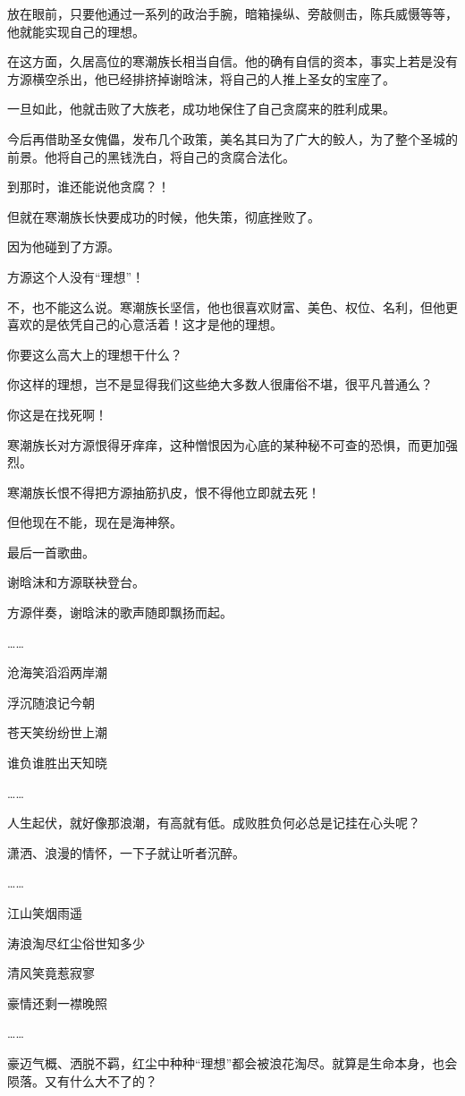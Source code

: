 \begin{this_body}
放在眼前，只要他通过一系列的政治手腕，暗箱操纵、旁敲侧击，陈兵威慑等等，他就能实现自己的理想。

在这方面，久居高位的寒潮族长相当自信。他的确有自信的资本，事实上若是没有方源横空杀出，他已经排挤掉谢晗沫，将自己的人推上圣女的宝座了。

一旦如此，他就击败了大族老，成功地保住了自己贪腐来的胜利成果。

今后再借助圣女傀儡，发布几个政策，美名其曰为了广大的鲛人，为了整个圣城的前景。他将自己的黑钱洗白，将自己的贪腐合法化。

到那时，谁还能说他贪腐？！

但就在寒潮族长快要成功的时候，他失策，彻底挫败了。

因为他碰到了方源。

方源这个人没有“理想”！

不，也不能这么说。寒潮族长坚信，他也很喜欢财富、美色、权位、名利，但他更喜欢的是依凭自己的心意活着！这才是他的理想。

你要这么高大上的理想干什么？

你这样的理想，岂不是显得我们这些绝大多数人很庸俗不堪，很平凡普通么？

你这是在找死啊！

寒潮族长对方源恨得牙痒痒，这种憎恨因为心底的某种秘不可查的恐惧，而更加强烈。

寒潮族长恨不得把方源抽筋扒皮，恨不得他立即就去死！

但他现在不能，现在是海神祭。

最后一首歌曲。

谢晗沫和方源联袂登台。

方源伴奏，谢晗沫的歌声随即飘扬而起。

……

沧海笑滔滔两岸潮

浮沉随浪记今朝

苍天笑纷纷世上潮

谁负谁胜出天知晓

……

人生起伏，就好像那浪潮，有高就有低。成败胜负何必总是记挂在心头呢？

潇洒、浪漫的情怀，一下子就让听者沉醉。

……

江山笑烟雨遥

涛浪淘尽红尘俗世知多少

清风笑竟惹寂寥

豪情还剩一襟晚照

……

豪迈气概、洒脱不羁，红尘中种种“理想”都会被浪花淘尽。就算是生命本身，也会陨落。又有什么大不了的？


\end{this_body}
